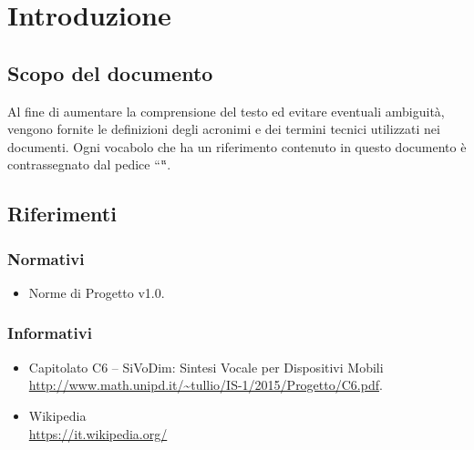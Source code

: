 \section{Introduzione}

\subsection{Scopo del documento}
Al fine di aumentare la comprensione del testo ed evitare eventuali ambiguità, vengono fornite le definizioni degli acronimi e dei termini tecnici
utilizzati nei documenti. Ogni vocabolo che ha un riferimento contenuto in questo documento è contrassegnato dal pedice “\G“.

\subsection{Riferimenti}

\subsubsection{Normativi}
\begin{itemize}
\item Norme di Progetto v1.0.
\end{itemize}

\subsubsection{Informativi}
\begin{itemize}
\item Capitolato C6 – SiVoDim: Sintesi Vocale per Dispositivi Mobili\\ 
\url{http://www.math.unipd.it/~tullio/IS-1/2015/Progetto/C6.pdf}.
\item Wikipedia\\
\url{https://it.wikipedia.org/}
\end{itemize}

\newpage


